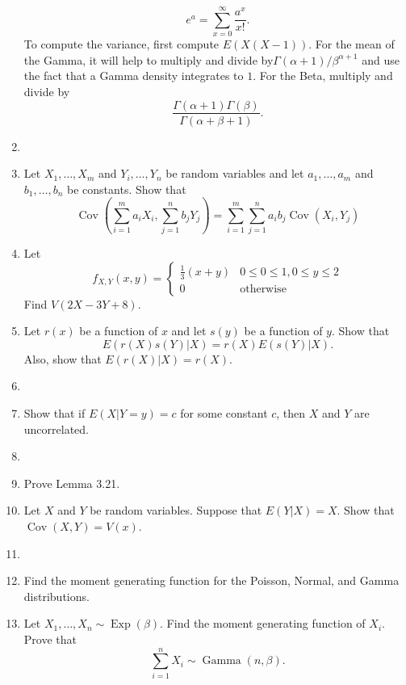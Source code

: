 \documentclass{article}
\begin{document}
\begin{enumerate}
	$$
	e^a = \sum_{x = 0}^\infty \frac{a^x}{x!}.
	$$
	To compute the variance, first compute $E(X(X -1))$. For the mean of the Gamma, it will help to multiply and divide by$\Gamma(\alpha + 1)/\beta^{\alpha + 1}$ and use the fact that a Gamma density integrates to $1$. For the Beta, multiply and divide by
	$$
	\frac{\Gamma(\alpha + 1) \Gamma(\beta)}{\Gamma(\alpha + \beta + 1)}.
	$$
	\item 
	\item Let $X_1, \dots, X_m$ and $Y_i, \dots, Y_n$ be random variables and let $a_1, \dots, a_m$ and $b_1, \dots, b_n$ be constants. Show that
	$$
	\operatorname{Cov}\left( \sum_{i = 1}^m a_i X_i, \sum_{j = 1}^n b_j Y_j \right) = \sum_{i = 1}^m \sum_{j = 1}^n a_i b_j \operatorname{Cov}(X_i, Y_j)
	$$
	\item Let
	$$
	f_{X, Y}(x, y) =
	\begin{cases}
	\frac{1}{3}(x + y) & 0 \leq 0 \leq 1, 0 \leq y \leq 2 \\
	0 & \text{otherwise}
	\end{cases}
	$$
	Find $V(2X - 3Y + 8)$.
	\item Let $r(x)$ be a function of $x$ and let $s(y)$ be a function of $y$. Show that
	$$
	E(r(X)s(Y)|X) = r(X)E(s(Y)|X).
	$$
	Also, show that $E(r(X)|X) = r(X)$.
	\item 
	\item Show that if $E(X|Y = y) = c$ for some constant $c$, then $X$ and $Y$ are uncorrelated.
	\item 
	\item Prove Lemma 3.21.
	\item Let $X$ and $Y$ be random variables. Suppose that $E(Y|X) = X$. Show that $\operatorname{Cov}(X, Y) = V(x)$.
	\item
	\item Find the moment generating function for the Poisson, Normal, and Gamma distributions.
	\item Let $X_1, \dots, X_n \sim \operatorname{Exp}(\beta)$. Find the moment generating function of $X_i$. Prove that
	$$
	\sum_{i = 1}^n X_i \sim \operatorname{Gamma}(n, \beta).
	$$
\end{enumerate}
\end{document}
